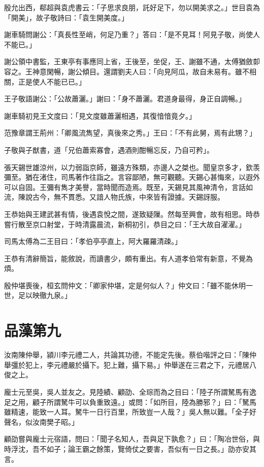 殷允出西，郗超與袁虎書云：「子思求良朋，託好足下，勿以開美求之。」世目袁為「開美」，故子敬詩曰：「袁生開美度。」

謝車騎問謝公：「真長性至峭，何足乃重？」答曰：「是不見耳！阿見子敬，尚使人不能已。」

謝公領中書監，王東亭有事應同上省，王後至，坐促，王、謝雖不通，太傅猶斂厀容之。王神意閑暢，謝公傾目。還謂劉夫人曰：「向見阿瓜，故自未易有。雖不相關，正是使人不能已已。」

王子敬語謝公：「公故蕭灑。」謝曰：「身不蕭灑。君道身最得，身正自調暢。」

謝車騎初見王文度曰：「見文度雖蕭灑相遇，其復愔愔竟夕。」

范豫章謂王荊州：「卿風流雋望，真後來之秀。」王曰：「不有此舅，焉有此甥？」

子敬與子猷書，道「兄伯蕭索寡會，遇酒則酣暢忘反，乃自可矜」。

張天錫世雄涼州，以力弱詣京師，雖遠方殊類，亦邊人之桀也。聞皇京多才，欽羡彌至。猶在渚住，司馬著作往詣之。言容鄙陋，無可觀聽。天錫心甚悔來，以遐外可以自固。王彌有雋才美譽，當時聞而造焉。既至，天錫見其風神清令，言話如流，陳說古今，無不貫悉。又諳人物氏族，中來皆有證據。天錫訝服。

王恭始與王建武甚有情，後遇袁悅之間，遂致疑隟。然每至興會，故有相思。時恭嘗行散至京口射堂，于時清露晨流，新桐初引，恭目之曰：「王大故自濯濯。」

司馬太傅為二王目曰：「孝伯亭亭直上，阿大羅羅清疎。」

王恭有清辭簡旨，能敘說，而讀書少，頗有重出。有人道孝伯常有新意，不覺為煩。

殷仲堪喪後，桓玄問仲文：「卿家仲堪，定是何似人？」仲文曰：「雖不能休明一世，足以映徹九泉。」



\chapter{品藻第九}

汝南陳仲舉，潁川李元禮二人，共論其功德，不能定先後。蔡伯喈評之曰：「陳仲舉彊於犯上，李元禮嚴於攝下。犯上難，攝下易。」仲舉遂在三君之下，元禮居八俊之上。

龐士元至吳，吳人並友之。見陸績、顧劭、全琮而為之目曰：「陸子所謂駑馬有逸足之用，顧子所謂駑牛可以負重致遠。」或問：「如所目，陸為勝邪？」曰：「駑馬雖精速，能致一人耳。駑牛一日行百里，所致豈一人哉？」吳人無以難。「全子好聲名，似汝南樊子昭。」

顧劭嘗與龐士元宿語，問曰：「聞子名知人，吾與足下孰愈？」曰：「陶冶世俗，與時浮沈，吾不如子；論王霸之餘策，覽倚仗之要害，吾似有一日之長。」劭亦安其言。

